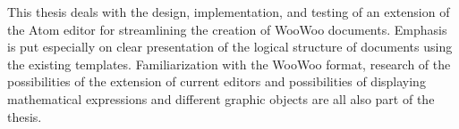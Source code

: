 This thesis deals with the design, implementation, and testing of an extension of the Atom editor for streamlining the
creation of WooWoo documents. Emphasis is put especially on clear presentation of the logical structure of documents
using the existing templates. Familiarization with the WooWoo format, research of the possibilities of the extension of
current editors and possibilities of displaying mathematical expressions and different graphic objects are all also part
of the thesis.
